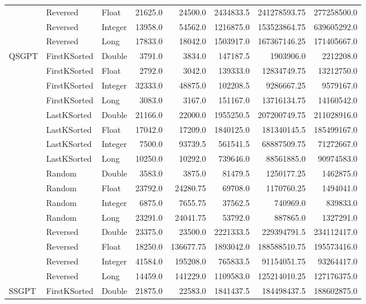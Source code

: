 \documentclass[unicode,11pt,a4paper,oneside,numbers=endperiod,openany]{scrartcl}
\begin{document}
\begin{center}
\begin{longtable}{|l|l|l|r|r|r|r|r|}
            & Reversed & Float & 21625.0 & 24500.0 & 2434833.5 & 241278593.75 & 277258500.0 \\
            & Reversed & Integer & 13958.0 & 54562.0 & 1216875.0 & 153523864.75 & 639605292.0 \\
            & Reversed & Long & 17833.0 & 18042.0 & 1503917.0 & 167367146.25 & 171405667.0 \\
            \hline
            \multirow{16}{*}{QSGPT} & FirstKSorted & Double & 3791.0 & 3834.0 & 147187.5 & 1903906.0 & 2212208.0 \\
            & FirstKSorted & Float & 2792.0 & 3042.0 & 139333.0 & 12834749.75 & 13212750.0 \\
            & FirstKSorted & Integer & 32333.0 & 48875.0 & 102208.5 & 9286667.25 & 9579167.0 \\
            & FirstKSorted & Long & 3083.0 & 3167.0 & 151167.0 & 13716134.75 & 14160542.0 \\
            & LastKSorted & Double & 21166.0 & 22000.0 & 1955250.5 & 207200749.75 & 211028916.0 \\
            & LastKSorted & Float & 17042.0 & 17209.0 & 1840125.0 & 181340145.5 & 185499167.0 \\
            & LastKSorted & Integer & 7500.0 & 93739.5 & 561541.5 & 68887509.75 & 71272667.0 \\
            & LastKSorted & Long & 10250.0 & 10292.0 & 739646.0 & 88561885.0 & 90974583.0 \\
            & Random & Double & 3583.0 & 3875.0 & 81479.5 & 1250177.25 & 1462875.0 \\
            & Random & Float & 23792.0 & 24280.75 & 69708.0 & 1170760.25 & 1494041.0 \\
            & Random & Integer & 6875.0 & 7655.75 & 37562.5 & 740969.0 & 839833.0 \\
            & Random & Long & 23291.0 & 24041.75 & 53792.0 & 887865.0 & 1327291.0 \\
            & Reversed & Double & 23375.0 & 23500.0 & 2221333.5 & 229394791.5 & 234112417.0 \\
            & Reversed & Float & 18250.0 & 136677.75 & 1893042.0 & 188588510.75 & 195573416.0 \\
            & Reversed & Integer & 41584.0 & 195208.0 & 765833.5 & 91154051.75 & 93264417.0 \\
            & Reversed & Long & 14459.0 & 141229.0 & 1109583.0 & 125214010.25 & 127176375.0 \\
            \hline
            \multirow{10}{*}{SSGPT} & FirstKSorted & Double & 21875.0 & 22583.0 & 1841437.5 & 184498437.5 & 188602875.0 \\

\end{longtable}
\end{center}
\end{document}
